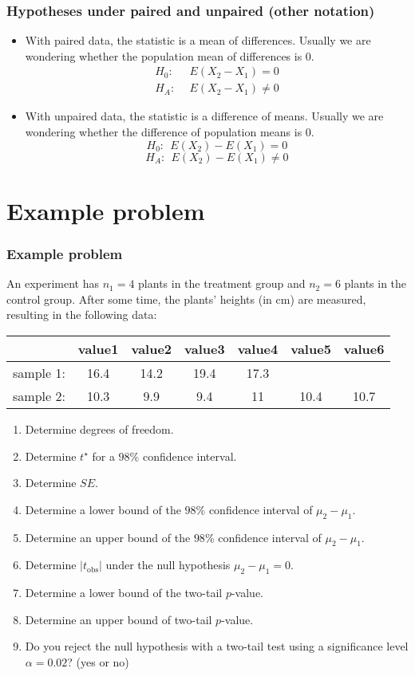 \documentclass[11pt,containsverbatim,handout]{beamer}
\begin{document}
\begin{frame}
\frametitle{Hypotheses under paired and unpaired (other notation)}
\begin{itemize}
\item With paired data, the statistic is a mean of differences. Usually we are wondering whether the population mean of differences is 0.
\begin{align*}
H_0:&~~ E(X_2 - X_1)=0 \\
H_A:&~~ E(X_2 - X_1)\ne 0
\end{align*}
\item With unpaired data, the statistic is a difference of means. Usually we are wondering whether the difference of population means is 0.
$$H_0:~~ E(X_2) - E(X_1)=0 $$
$$H_A:~~ E(X_2) - E(X_1)\ne 0 $$
\end{itemize}
\end{frame}


\section{Example problem}
\begin{frame}
\frametitle{Example problem} \vspace{-10pt}
An experiment has \(n_1 = 4\) plants in the treatment group and
\(n_2 = 6\) plants in the control group. After some time, the plants'
heights (in cm) are measured, resulting in the following data:
\begin{tabular}{|ccccccc|} \hline
& value1 & value2 & value3 & value4 & value5 & value6 \\ \hline
sample 1: & 16.4 & 14.2 & 19.4 & 17.3 & & \\
sample 2: & 10.3 & 9.9 & 9.4 & 11 & 10.4 & 10.7 \\ \hline
\end{tabular}

\begin{enumerate}
  \item Determine degrees of freedom.
  \item Determine \(t^\star\) for a \(98\%\) confidence interval.
  \item Determine \(SE\).
  \item Determine a lower bound of the \(98\%\) confidence interval of
\(\mu_2-\mu_1\).
  \item Determine an upper bound of the \(98\%\) confidence interval of
\(\mu_2-\mu_1\).
  \item Determine \(|t_\text{obs}|\) under the null hypothesis
\(\mu_2-\mu_1=0\).
  \item Determine a lower bound of the two-tail \(p\)-value.
  \item Determine an upper bound of two-tail \(p\)-value.
  \item Do you reject the null hypothesis with a two-tail test using a
significance level \(\alpha = 0.02\)? (yes or no)
\end{enumerate}
\end{frame}
\end{document}
